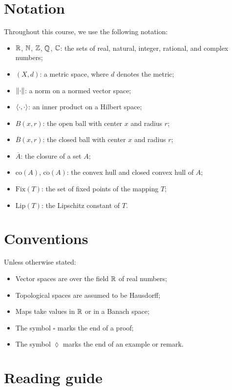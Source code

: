 \section*{Notation}

Throughout this course, we use the following notation:
\begin{itemize}
    \item $\mathbb{R}$, $\mathbb{N}$, $\mathbb{Z}$, $\mathbb{Q}$, $\mathbb{C}$: the sets of real, natural, integer,
          rational, and complex numbers;
    \item $(X, d)$: a metric space, where $d$ denotes the metric;
    \item $\left\| \cdot \right\|$: a norm on a normed vector space;
    \item $\langle \cdot, \cdot \rangle$: an inner product on a Hilbert space;
    \item $B(x, r)$: the open ball with center $x$ and radius $r$;
    \item $\overline{B}(x, r)$: the closed ball with center $x$ and radius $r$;
    \item $\overline{A}$: the closure of a set $A$;
    \item $\mathrm{co}(A)$, $\overline{\mathrm{co}}(A)$: the convex hull and
          closed convex hull of $A$;
    \item $\mathrm{Fix}(T)$: the set of fixed points of the mapping $T$;
    \item $\mathrm{Lip}(T)$: the Lipschitz constant of $T$.
\end{itemize}

\section*{Conventions}

Unless otherwise stated:
\begin{itemize}
    \item Vector spaces are over the field $\mathbb{R}$ of real numbers;
    \item Topological spaces are assumed to be Hausdorff;
    \item Maps take values in $\mathbb{R}$ or in a Banach space;
    \item The symbol $\square$ marks the end of a proof;
    \item The symbol $\lozenge$ marks the end of an example or remark.
\end{itemize}

\section*{Reading guide}

